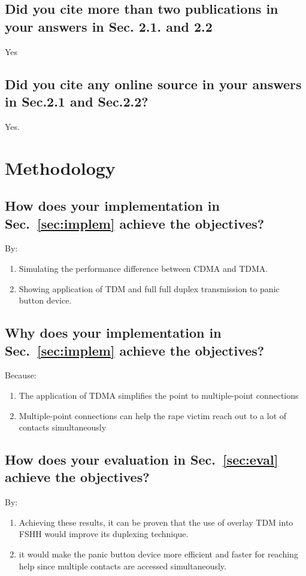 \subsection{Did you cite more than two publications in your answers in Sec. 2.1. and 2.2}
Yes
	
\subsection{Did you cite any online source in your answers in Sec.2.1 and Sec.2.2?}
Yes.


\section{Methodology}

\subsection{How does your implementation in Sec.~\ref{sec:implem} achieve the objectives?}
By:
\begin{enumerate}
	\item Simulating the performance difference between CDMA and TDMA.
	\item Showing application of TDM and full full duplex transmission to panic button device.
\end{enumerate}

\subsection{Why does your implementation in Sec.~\ref{sec:implem} achieve the objectives?}
Because:
\begin{enumerate}
	\item The application of TDMA simplifies the point to multiple-point connections
	
	\item Multiple-point connections can help the rape victim reach out to a lot of contacts simultaneously
	
\end{enumerate}

\subsection{How does your evaluation in Sec.~\ref{sec:eval} achieve the objectives?}
By:
\begin{enumerate}
	\item Achieving these results, it can be proven that the use of overlay TDM into FSHH would improve its duplexing technique.
	\item it would make the panic button device more efficient and faster for reaching help since multiple contacts are accessed simultaneously.
\end{enumerate}

